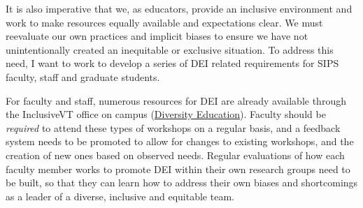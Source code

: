 \documentclass[11pt]{article}
\begin{document}

















It is also imperative that we, as educators, provide an inclusive environment and work to make resources equally available and expectations clear. We must reevaluate our own practices and implicit biases to ensure we have not unintentionally created an inequitable or exclusive situation. To address this need, I want to work to develop a series of DEI related requirements for SIPS faculty, staff and graduate students. 

For faculty and staff, numerous resources for DEI are already available through the InclusiveVT office on campus (\href{https://www.inclusive.vt.edu/Initiatives/DiversityEducationandPrograms.html}{Diversity Education}). Faculty should be \emph{required} to attend these types of workshops on a regular basis, and a feedback system needs to be promoted to allow for changes to existing workshops, and the creation of new ones based on observed needs. Regular evaluations of how each faculty member works to promote DEI within their own research groups need to be built, so that they can learn how to address their own biases and shortcomings as a leader of a diverse, inclusive and equitable team.
\end{document}
